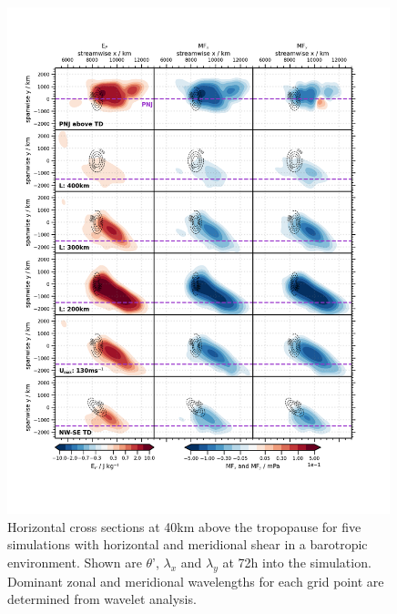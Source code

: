 \begin{figure}[]
    \centering
    \includegraphics[width=0.99\textwidth]{figures_3D/waveletAna_fluxes_sim.png}
    \caption{Horizontal cross sections at 40km above the tropopause for five simulations with horizontal and meridional shear in a barotropic environment. Shown are $\theta$', $\lambda_x$ and $\lambda_y$ at 72h into the simulation. Dominant zonal and meridional wavelengths for each grid point are determined from wavelet analysis.}
    \label{fig:waveletAna_dudy}
\end{figure}